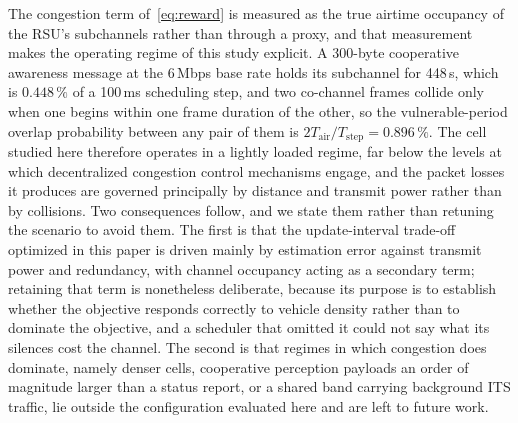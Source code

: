 \documentclass[journal]{IEEEtran}
\begin{document}
The congestion term of~\eqref{eq:reward} is measured as the true airtime occupancy of the RSU's subchannels rather than through a proxy, and that measurement makes the operating regime of this study explicit. A 300-byte cooperative awareness message at the 6\,Mbps base rate holds its subchannel for 448\,\textmu s, which is $0.448\,\%$ of a 100\,ms scheduling step, and two co-channel frames collide only when one begins within one frame duration of the other, so the vulnerable-period overlap probability between any pair of them is $2T_{\mathrm{air}}/T_{\mathrm{step}} = 0.896\,\%$. The cell studied here therefore operates in a lightly loaded regime, far below the levels at which decentralized congestion control mechanisms engage, and the packet losses it produces are governed principally by distance and transmit power rather than by collisions. Two consequences follow, and we state them rather than retuning the scenario to avoid them. The first is that the update-interval trade-off optimized in this paper is driven mainly by estimation error against transmit power and redundancy, with channel occupancy acting as a secondary term; retaining that term is nonetheless deliberate, because its purpose is to establish whether the objective responds correctly to vehicle density rather than to dominate the objective, and a scheduler that omitted it could not say what its silences cost the channel. The second is that regimes in which congestion does dominate, namely denser cells, cooperative perception payloads an order of magnitude larger than a status report, or a shared band carrying background ITS traffic, lie outside the configuration evaluated here and are left to future work.

\end{document}
